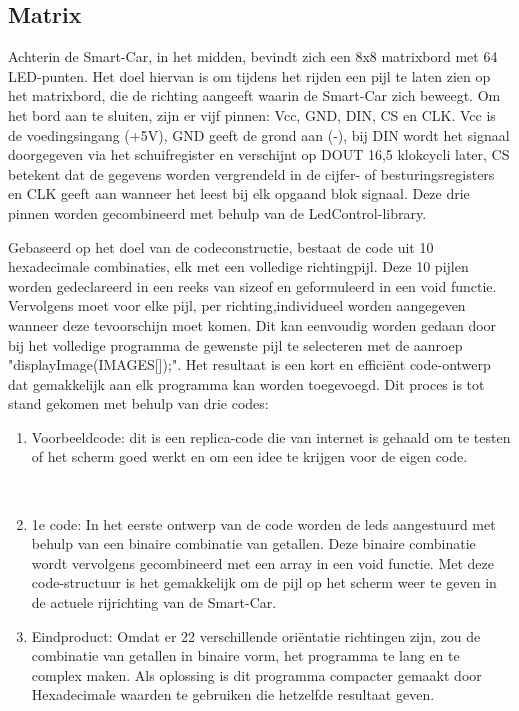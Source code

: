 \subsection{Matrix}
Achterin de \gls{Smart-Car}, in het midden, bevindt zich een 8x8 matrixbord met 64 LED-punten. Het doel hiervan is om tijdens het rijden een pijl te laten zien op het matrixbord, die de richting aangeeft waarin de \gls{Smart-Car} zich beweegt. Om het bord aan te sluiten, zijn er vijf pinnen: Vcc, GND, DIN, CS en CLK. Vcc is de voedingsingang (+5V), GND geeft de grond aan (-), bij DIN wordt het signaal doorgegeven via het schuifregister en verschijnt op DOUT 16,5 klokcycli later, CS betekent dat de gegevens worden vergrendeld in de cijfer- of besturingsregisters en CLK geeft aan wanneer het leest bij elk opgaand blok signaal. Deze drie pinnen worden gecombineerd met behulp van de LedControl-library.

Gebaseerd op het doel van de codeconstructie, bestaat de code uit 10 hexadecimale combinaties, elk met een volledige richtingpijl. Deze 10 pijlen worden gedeclareerd in een reeks van sizeof en geformuleerd in een void functie. Vervolgens moet voor elke pijl, per richting,individueel worden aangegeven wanneer deze tevoorschijn moet komen. Dit kan eenvoudig worden gedaan door bij het volledige programma de gewenste pijl te selecteren met de aanroep "displayImage(IMAGES[]);". Het resultaat is een kort en efficiënt code-ontwerp dat gemakkelijk aan elk programma kan worden toegevoegd.
Dit proces is tot stand gekomen met behulp van drie codes: 
\begin{enumerate}
    \item Voorbeeldcode: dit is een replica-code die van internet is gehaald om te testen of het scherm goed werkt en om een idee te krijgen voor de eigen code.
    \begin{lstlisting}
        
    \end{lstlisting}
    \item 1e code: In het eerste ontwerp van de code worden de leds aangestuurd met behulp van een binaire combinatie van getallen. Deze binaire combinatie wordt vervolgens gecombineerd met een array in een void functie. Met deze code-structuur is het gemakkelijk om de pijl op het scherm weer te geven in de actuele rijrichting van de \gls{Smart-Car}. 
    \item Eindproduct: Omdat er 22 verschillende oriëntatie richtingen zijn, zou de combinatie van getallen in binaire vorm, het programma te lang en te complex maken. Als oplossing  is dit programma compacter gemaakt door Hexadecimale waarden te gebruiken die hetzelfde resultaat geven.
\end{enumerate}

